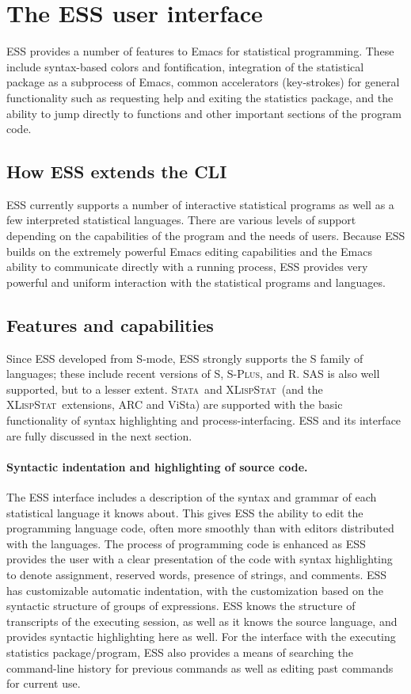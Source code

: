 \documentclass{article}
\newcommand*{\Splus}{\textsc{S-Plus}}
\newcommand*{\XLispStat}{\textsc{XLispStat}}
\newcommand*{\Stata}{\textsc{Stata}}
\begin{document}
\section{The ESS user interface}
\label{sec:ESS}

ESS provides a number of features to Emacs for statistical
programming.  These include syntax-based colors and fontification,
integration of the statistical package as a subprocess of Emacs,
common accelerators (key-strokes) for general functionality such as
requesting help and exiting the statistics package, and the ability to
jump directly to functions and other important sections of the
program code.

\subsection{How ESS extends the CLI}
\label{sec:ESS:UI}

ESS currently supports a number of interactive statistical programs as
well as a few interpreted statistical languages.  There are various
levels of support depending on the capabilities of the program and the
needs of users.  Because ESS builds on the extremely powerful Emacs
editing capabilities and the Emacs ability to communicate directly
with a running process, ESS provides very powerful and uniform
interaction with the statistical programs and languages.

\subsection{Features and capabilities}
\label{sec:ESS:features}

Since ESS developed from S-mode, ESS strongly supports the S family of
languages; these include recent versions of S, \Splus, and R.  SAS is
also well supported, but to a lesser extent.  \Stata\ and \XLispStat\ 
(and the \XLispStat\ extensions, ARC and ViSta) are supported with the
basic functionality of syntax highlighting and process-interfacing.
ESS and its interface are fully discussed in the next section.

\paragraph{Syntactic indentation and highlighting of source code.}
The ESS interface includes a description of the syntax and grammar of
each statistical language it knows about.  This gives ESS the ability
to edit the programming language code, often more smoothly than with
editors distributed with the languages.  The process of programming
code is enhanced as ESS provides the user with a clear presentation of
the code with syntax highlighting to denote assignment, reserved
words, presence of strings, and comments.  ESS has customizable
automatic indentation, with the customization based on the syntactic
structure of groups of expressions.  ESS knows the structure of
transcripts of the executing session, as well as it knows the source
language, and provides syntactic highlighting here as well.  For the
interface with the executing statistics package/program, ESS also
provides a means of searching the command-line history for previous
commands as well as editing past commands for current use.
\end{document}
